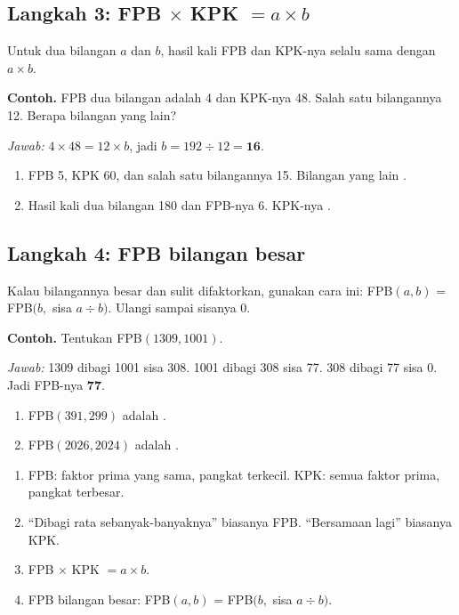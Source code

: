 \documentclass[11pt,a4paper]{article}
\begin{document}
\subsection*{Langkah 3: FPB $\times$ KPK $= a \times b$}
Untuk dua bilangan $a$ dan $b$, hasil kali FPB dan KPK-nya selalu sama dengan $a \times b$.

\begin{contoh}
\textbf{Contoh.} FPB dua bilangan adalah 4 dan KPK-nya 48. Salah satu bilangannya 12.
Berapa bilangan yang lain?

\textit{Jawab:} $4 \times 48 = 12 \times b$, jadi $b = 192 \div 12 = \textbf{16}$.
\end{contoh}

\begin{giliranmu}
\begin{enumerate}[label=\alph*.]
    \item FPB 5, KPK 60, dan salah satu bilangannya 15. Bilangan yang lain \kosong.
    \item Hasil kali dua bilangan 180 dan FPB-nya 6. KPK-nya \kosong.
\end{enumerate}
\end{giliranmu}

\subsection*{Langkah 4: FPB bilangan besar}
Kalau bilangannya besar dan sulit difaktorkan, gunakan cara ini:
FPB$(a, b)$ = FPB$(b,$ sisa $a \div b)$. Ulangi sampai sisanya 0.

\begin{contoh}
\textbf{Contoh.} Tentukan FPB$(1309, 1001)$.

\textit{Jawab:} 1309 dibagi 1001 sisa 308. 1001 dibagi 308 sisa 77. 308 dibagi 77 sisa 0.
Jadi FPB-nya \textbf{77}.
\end{contoh}

\begin{giliranmu}
\begin{enumerate}[label=\alph*.]
    \item FPB$(391, 299)$ adalah \kosong.
    \item FPB$(2026, 2024)$ adalah \kosong.
\end{enumerate}
\end{giliranmu}

\begin{rangkuman}
\begin{enumerate}
    \item FPB: faktor prima yang sama, pangkat terkecil. KPK: semua faktor prima, pangkat terbesar.
    \item ``Dibagi rata sebanyak-banyaknya'' biasanya FPB. ``Bersamaan lagi'' biasanya KPK.
    \item FPB $\times$ KPK $= a \times b$.
    \item FPB bilangan besar: FPB$(a, b)$ = FPB$(b,$ sisa $a \div b)$.
\end{enumerate}
\end{rangkuman}
\end{document}
